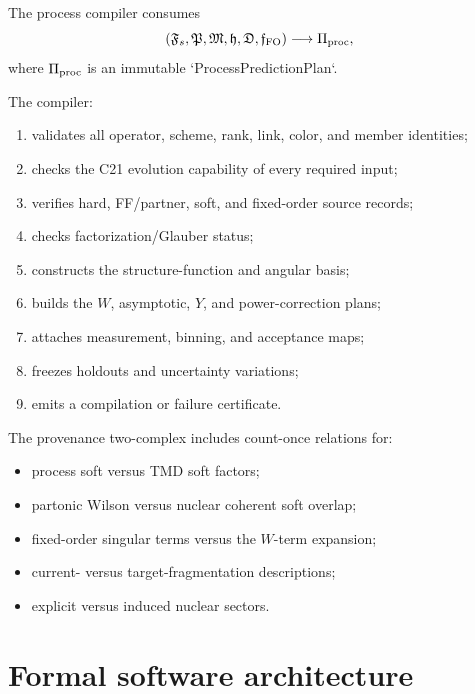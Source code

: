 \documentclass[11pt]{article}
\newcommand{\FO}{\mathrm{FO}}
\begin{document}
The process compiler consumes
\begin{equation}
 \left(
 \mathfrak F_s,
 \mathfrak P,
 \mathfrak M,
 \mathfrak h,
 \mathfrak D,
 \mathfrak f_{\FO}
 \right)
 \longrightarrow
 \Pi_{\rm proc},
 \label{eq:process-compiler}
\end{equation}
where \(\Pi_{\rm proc}\) is an immutable `ProcessPredictionPlan`.

The compiler:
\begin{enumerate}
\item validates all operator, scheme, rank, link, color, and member identities;
\item checks the C21 evolution capability of every required input;
\item verifies hard, FF/partner, soft, and fixed-order source records;
\item checks factorization/Glauber status;
\item constructs the structure-function and angular basis;
\item builds the \(W\), asymptotic, \(Y\), and power-correction plans;
\item attaches measurement, binning, and acceptance maps;
\item freezes holdouts and uncertainty variations;
\item emits a compilation or failure certificate.
\end{enumerate}

The provenance two-complex includes count-once relations for:
\begin{itemize}
\item process soft versus TMD soft factors;
\item partonic Wilson versus nuclear coherent soft overlap;
\item fixed-order singular terms versus the \(W\)-term expansion;
\item current- versus target-fragmentation descriptions;
\item explicit versus induced nuclear sectors.
\end{itemize}

\section{Formal software architecture}
\label{sec:software}
\end{document}
